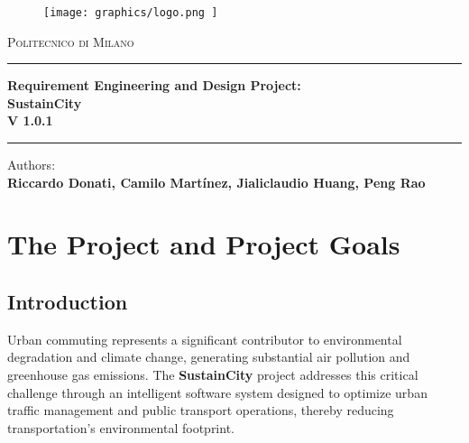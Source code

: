 \documentclass[11.5pt]{article}
\begin{document}
    \begin{titlingpage}
        \begin{center}
            \begin{figure}
                \centering
                \texttt{[image: 
                    graphics/logo.png
                ]}
            \end{figure}
            \Large{\textsc{Politecnico di Milano}}
            \vspace{1cm}
            \rule{0.95\textwidth}{0.7mm}
            {\Large{\textbf{Requirement Engineering and Design Project:\\ SustainCity \\ V 1.0.1}}}
            \rule{0.95\textwidth}{0.7mm}
            \vspace{1cm}
            \large{Authors: \\ \textbf{Riccardo Donati, Camilo Martínez, Jialiclaudio Huang, Peng Rao}}

            \vspace{1cm}
            
        \end{center}
    \end{titlingpage}


    \tableofcontents

    \clearpage

    \setcounter{page}{1}

    \section{The Project and Project Goals}
    
    \subsection{Introduction}
    Urban commuting represents a significant contributor to environmental degradation and climate change, generating substantial air pollution and greenhouse gas emissions. The \textbf{SustainCity} project addresses this critical challenge through an intelligent software system designed to optimize urban traffic management and public transport operations, thereby reducing transportation's environmental footprint.
    
\end{document}
